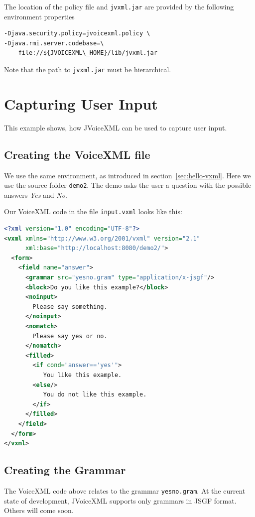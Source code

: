 \documentclass[11pt,a4paper]{article}
\begin{document}
The location of the policy file and \texttt{jvxml.jar} are provided by the 
following environment properties

\begin{lstlisting}
-Djava.security.policy=jvoicexml.policy \
-Djava.rmi.server.codebase=\
    file://${JVOICEXML\_HOME}/lib/jvxml.jar
\end{lstlisting}

Note that the path to \texttt{jvxml.jar} must be hierarchical.

\section{Capturing User Input}

This example shows, how JVoiceXML can be used to capture user input. 

\subsection{Creating the VoiceXML file}

We use the same environment, as introduced in section~\ref{sec:hello-vxml}. Here
we use the source folder \texttt{demo2}.
The demo asks the user a question with the possible answers
\emph{Yes} and \emph{No}.

Our VoiceXML code in the file \texttt{input.vxml} looks like this:

\begin{lstlisting}[language=XML]
<?xml version="1.0" encoding="UTF-8"?> 
<vxml xmlns="http://www.w3.org/2001/vxml" version="2.1"
      xml:base="http://localhost:8080/demo2/">
  <form>
    <field name="answer">
      <grammar src="yesno.gram" type="application/x-jsgf"/>
      <block>Do you like this example?</block>
      <noinput>
        Please say something.
      </noinput>
      <nomatch>
        Please say yes or no.
      </nomatch>
      <filled>
        <if cond="answer=='yes'">
           You like this example.
        <else/>
           You do not like this example.
        </if>
      </filled>
    </field>
  </form>
</vxml>
\end{lstlisting}

\subsection{Creating the Grammar}

The VoiceXML code above relates to the grammar \texttt{yesno.gram}. At the
current state of development, JVoiceXML supports only grammars in JSGF format.
Others will come soon.
\end{document}
